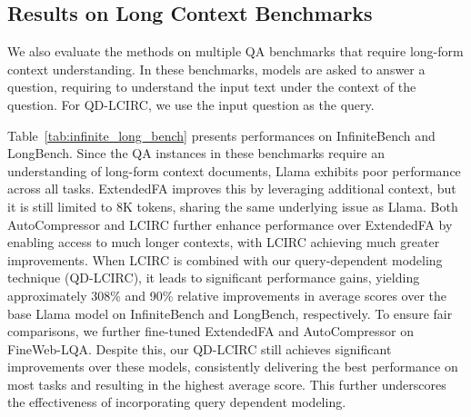 \subsection{Results on Long Context Benchmarks}
We also evaluate the methods on multiple QA benchmarks that require long-form context understanding.
In these benchmarks, models are asked to answer a question, requiring to understand the input text under the context of the question. 
For QD-LCIRC, we use the input question as the query.

Table~\ref{tab:infinite_long_bench} presents performances on InfiniteBench and LongBench.
Since the QA instances in these benchmarks require an understanding of long-form context documents, Llama exhibits poor performance across all tasks.
ExtendedFA improves this by leveraging additional context, but it is still limited to 8K tokens, sharing the same underlying issue as Llama.
Both AutoCompressor and LCIRC further enhance performance over ExtendedFA by enabling access to much longer contexts, with LCIRC achieving much greater improvements.
When LCIRC is combined with our query-dependent modeling technique (QD-LCIRC), it leads to significant performance gains, yielding approximately 308\% and 90\% relative improvements in average scores over the base Llama model on InfiniteBench and LongBench, respectively.
To ensure fair comparisons, we further fine-tuned ExtendedFA and AutoCompressor on FineWeb-LQA.
Despite this, our QD-LCIRC still achieves significant improvements over these models, consistently delivering the best performance on most tasks and resulting in the highest average score.
This further underscores the effectiveness of incorporating query dependent modeling.



